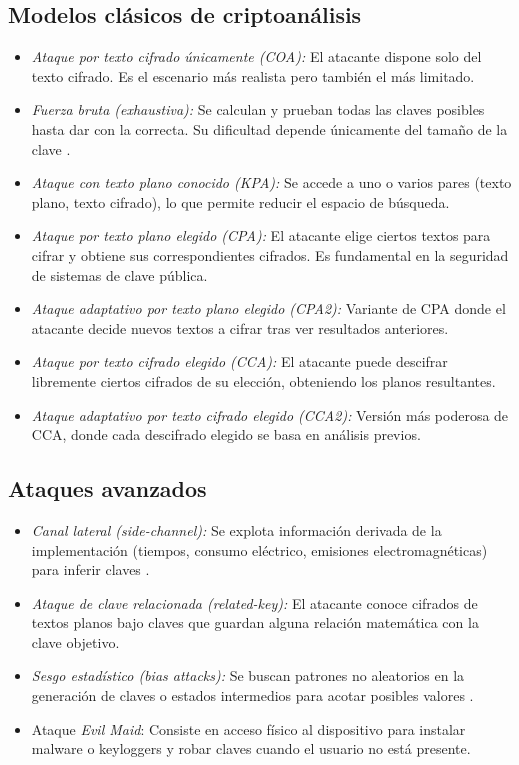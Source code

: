 \subsection{Modelos clásicos de criptoanálisis}

\begin{itemize}
  \item \emph{Ataque por texto cifrado únicamente (COA):} El atacante dispone solo del texto cifrado. Es el escenario más realista pero también el más limitado.
  \item \emph{Fuerza bruta (exhaustiva):} Se calculan y prueban todas las claves posibles hasta dar con la correcta. Su dificultad depende únicamente del tamaño de la clave \cite{cryptography_attacks_6_types_and_prevention}\cite{types_of_cryptographic_attacks_to_know}.
  \item \emph{Ataque con texto plano conocido (KPA):} Se accede a uno o varios pares (texto plano, texto cifrado), lo que permite reducir el espacio de búsqueda.
  \item \emph{Ataque por texto plano elegido (CPA):} El atacante elige ciertos textos para cifrar y obtiene sus correspondientes cifrados. Es fundamental en la seguridad de sistemas de clave pública.
  \item \emph{Ataque adaptativo por texto plano elegido (CPA2):} Variante de CPA donde el atacante decide nuevos textos a cifrar tras ver resultados anteriores.
  \item \emph{Ataque por texto cifrado elegido (CCA):} El atacante puede descifrar libremente ciertos cifrados de su elección, obteniendo los planos resultantes.
  \item \emph{Ataque adaptativo por texto cifrado elegido (CCA2):} Versión más poderosa de CCA, donde cada descifrado elegido se basa en análisis previos.
\end{itemize}

\subsection{Ataques avanzados}

\begin{itemize}
  \item \emph{Canal lateral (side-channel):} Se explota información derivada de la implementación (tiempos, consumo eléctrico, emisiones electromagnéticas) para inferir claves \cite{cryptanalysis_and_types_of_attacks}.
  \item \emph{Ataque de clave relacionada (related-key):} El atacante conoce cifrados de textos planos bajo claves que guardan alguna relación matemática con la clave objetivo.
  \item \emph{Sesgo estadístico (bias attacks):} Se buscan patrones no aleatorios en la generación de claves o estados intermedios para acotar posibles valores \cite{modern_cryptographic_attacks_guide_for_perplexed}.
  \item Ataque \emph{Evil Maid}: Consiste en acceso físico al dispositivo para instalar malware o keyloggers y robar claves cuando el usuario no está presente.
\end{itemize}